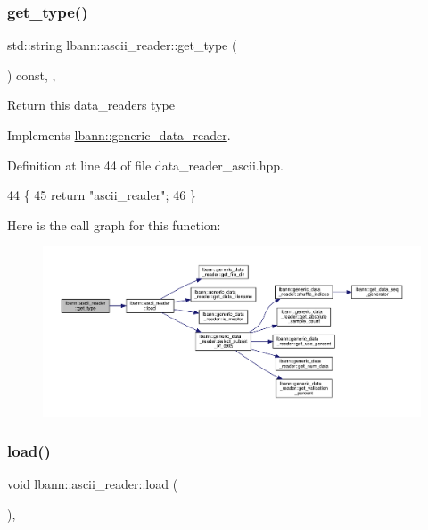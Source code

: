 \subsubsection{\texorpdfstring{get\+\_\+type()}{get\_type()}}
{\footnotesize\ttfamily std\+::string lbann\+::ascii\+\_\+reader\+::get\+\_\+type (\begin{DoxyParamCaption}{ }\end{DoxyParamCaption}) const\hspace{0.3cm}{\ttfamily [inline]}, {\ttfamily [override]}, {\ttfamily [virtual]}}

Return this data\+\_\+reader\textquotesingle{}s type 

Implements \hyperlink{classlbann_1_1generic__data__reader_abeb849fb8e10b4fa317c90bc33f61758}{lbann\+::generic\+\_\+data\+\_\+reader}.



Definition at line 44 of file data\+\_\+reader\+\_\+ascii.\+hpp.


\begin{DoxyCode}
44                                       \{
45     \textcolor{keywordflow}{return} \textcolor{stringliteral}{"ascii\_reader"};
46   \}
\end{DoxyCode}
Here is the call graph for this function\+:\nopagebreak
\begin{figure}[H]
\begin{center}
\leavevmode
\includegraphics[width=350pt]{classlbann_1_1ascii__reader_aee041430b7ef13c8324393568fa89922_cgraph}
\end{center}
\end{figure}
\mbox{\label{classlbann_1_1ascii__reader_a678254a9d1c90459a1502d63e36a2b61}} 
\subsubsection{\texorpdfstring{load()}{load()}}
{\footnotesize\ttfamily void lbann\+::ascii\+\_\+reader\+::load (\begin{DoxyParamCaption}{ }\end{DoxyParamCaption})\hspace{0.3cm}{\ttfamily [override]}, {\ttfamily [virtual]}}

